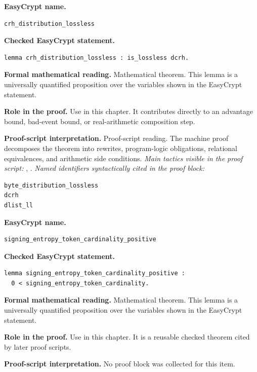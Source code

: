 \begin{formaltheorem}
\noindent\textbf{EasyCrypt name.}
\begin{lstlisting}[language=EasyCrypt,basicstyle=\ttfamily\scriptsize]
crh_distribution_lossless
\end{lstlisting}
\noindent\textbf{Checked EasyCrypt statement.}
\begin{lstlisting}[language=EasyCrypt,basicstyle=\ttfamily\scriptsize]
lemma crh_distribution_lossless : is_lossless dcrh.
\end{lstlisting}
\noindent\textbf{Formal mathematical reading.}
Mathematical theorem. This lemma is a universally quantified proposition over the variables shown in the EasyCrypt statement.

\noindent\textbf{Role in the proof.}
Use in this chapter. It contributes directly to an advantage bound, bad-event bound, or real-arithmetic composition step.

\noindent\textbf{Proof-script interpretation.}
Proof-script reading. The machine proof decomposes the theorem into rewrites, program-logic obligations, relational equivalences, and arithmetic side conditions.
\emph{Main tactics visible in the proof script:} , .
\emph{Named identifiers syntactically cited in the proof block:}
\begin{lstlisting}[language=EasyCrypt,basicstyle=\ttfamily\scriptsize]
byte_distribution_lossless
dcrh
dlist_ll
\end{lstlisting}

\end{formaltheorem}

\begin{formaltheorem}
\noindent\textbf{EasyCrypt name.}
\begin{lstlisting}[language=EasyCrypt,basicstyle=\ttfamily\scriptsize]
signing_entropy_token_cardinality_positive
\end{lstlisting}
\noindent\textbf{Checked EasyCrypt statement.}
\begin{lstlisting}[language=EasyCrypt,basicstyle=\ttfamily\scriptsize]
lemma signing_entropy_token_cardinality_positive :
  0 < signing_entropy_token_cardinality.
\end{lstlisting}
\noindent\textbf{Formal mathematical reading.}
Mathematical theorem. This lemma is a universally quantified proposition over the variables shown in the EasyCrypt statement.

\noindent\textbf{Role in the proof.}
Use in this chapter. It is a reusable checked theorem cited by later proof scripts.

\noindent\textbf{Proof-script interpretation.}
No proof block was collected for this item.

\end{formaltheorem}

